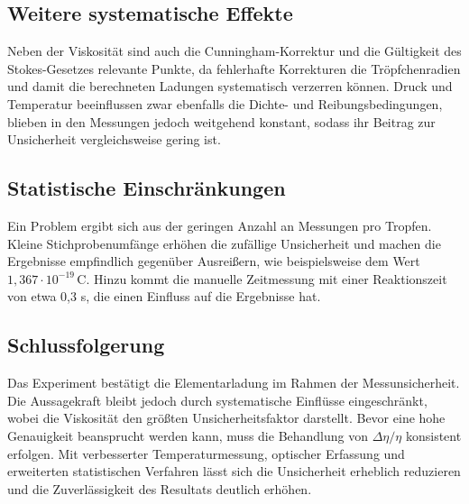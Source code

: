 \subsection{Weitere systematische Effekte}  
Neben der Viskosität sind auch die Cunningham-Korrektur und die Gültigkeit des Stokes-Gesetzes relevante Punkte, da fehlerhafte Korrekturen die Tröpfchenradien und damit die berechneten Ladungen systematisch verzerren können. Druck und Temperatur beeinflussen zwar ebenfalls die Dichte- und Reibungsbedingungen, blieben in den Messungen jedoch weitgehend konstant, sodass ihr Beitrag zur Unsicherheit vergleichsweise gering ist.

\subsection{Statistische Einschränkungen}  
Ein Problem ergibt sich aus der geringen Anzahl an Messungen pro Tropfen. Kleine Stichprobenumfänge erhöhen die zufällige Unsicherheit und machen die Ergebnisse empfindlich gegenüber Ausreißern, wie beispielsweise dem Wert $1{,}367\cdot10^{-19}\,\mathrm{C}$. Hinzu kommt die manuelle Zeitmessung mit einer Reaktionszeit von etwa 0,3 s, die einen Einfluss auf die Ergebnisse hat.

\subsection{Schlussfolgerung}  
Das Experiment bestätigt die Elementarladung im Rahmen der Messunsicherheit. Die Aussagekraft bleibt jedoch durch systematische Einflüsse eingeschränkt, wobei die Viskosität den größten Unsicherheitsfaktor darstellt. Bevor eine hohe Genauigkeit beansprucht werden kann, muss die Behandlung von $\Delta\eta/\eta$ konsistent erfolgen. Mit verbesserter Temperaturmessung, optischer Erfassung und erweiterten statistischen Verfahren lässt sich die Unsicherheit erheblich reduzieren und die Zuverlässigkeit des Resultats deutlich erhöhen.
